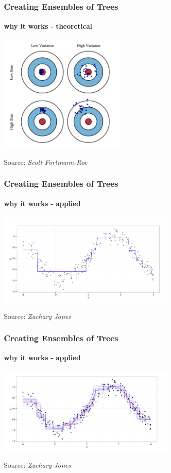 \documentclass{beamer}\usepackage[]{graphicx}\usepackage[]{color}
\begin{document}

\begin{frame}
\frametitle{Creating Ensembles of Trees}
\framesubtitle{why it works - theoretical}

\begin{center}
\includegraphics[width = 2.5in]{figure/bias_var_target.png}
\end{center}
\scriptsize Source: \textit{Scott Fortmann-Roe}

\end{frame}


\begin{frame}
\frametitle{Creating Ensembles of Trees}
\framesubtitle{why it works - applied}

\begin{center}
\includegraphics[width = 3.5in]{figure/cart_sin_curve.png}
\end{center}
\scriptsize Source: \textit{Zachary Jones}

\end{frame}


\begin{frame}
\frametitle{Creating Ensembles of Trees}
\framesubtitle{why it works - applied}

\begin{center}
\includegraphics[width = 3.5in]{figure/forest_sin_curve.png}
\end{center}
\scriptsize Source: \textit{Zachary Jones}

\end{frame}
\end{document}
